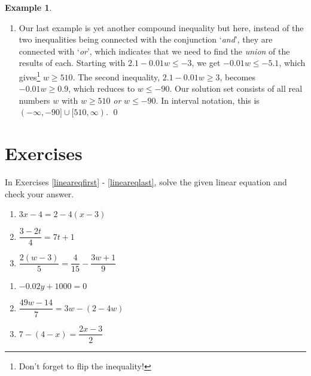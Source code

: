 \documentclass[11pt]{article}
\theoremstyle{definition}  %
\newtheorem{ex}{\bf Example}[section]
\newcounter{HW}
\begin{document}
\begin{ex}
\begin{enumerate}
\item  Our last example is yet another compound inequality but here, instead of the two inequalities being connected with the conjunction `\textit{and}', they are connected with `\textit{or}', which indicates that we need to find the \textit{union} of the results of each.  Starting with $2.1 - 0.01w \leq -3$, we get $-0.01 w \leq -5.1$, which gives\footnote{Don't forget to flip the inequality!} $w \geq 510$.  The second inequality, $2.1-0.01w \geq 3$, becomes $-0.01w \geq 0.9$, which reduces to  $w \leq -90$.  Our solution set consists of all real numbers $w$ with $w \geq 510$ \textit{or} $w \leq -90$.  In interval notation, this is $(-\infty, -90] \cup [510, \infty)$. \qed

\end{enumerate}

\end{ex}

\newpage

\section{Exercises}

In Exercises \ref{lineareqfirst} - \ref{lineareqlast}, solve the given linear equation and check your answer.  


\begin{multicols}{3}
\begin{enumerate}

\item $3x - 4 = 2 - 4(x-3)$\label{lineareqfirst} 
\item $\dfrac{3 - 2t}{4} = 7t+1$

\item  $\dfrac{2(w-3)}{5} = \dfrac{4}{15} - \dfrac{3w+1}{9}$ 

\setcounter{HW}{\value{enumi}}
\end{enumerate}
\end{multicols}

\begin{multicols}{3}
\begin{enumerate}
\setcounter{enumi}{\value{HW}}

\item  $-0.02y + 1000 = 0$  
\item  $\dfrac{49w - 14}{7}= 3w - (2-4w)$ 
\item  $7 - (4-x) = \dfrac{2x-3}{2}$  

\setcounter{HW}{\value{enumi}}
\end{enumerate}
\end{multicols}
\end{document}
